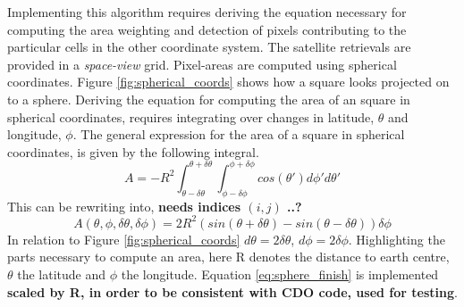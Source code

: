 
Implementing this algorithm requires deriving the equation necessary for computing the area weighting and detection of pixels contributing to the particular cells in the other coordinate system. The satellite retrievals are provided in a \textit{space-view} grid. Pixel-areas are computed using spherical coordinates. Figure \ref{fig:spherical_coords} shows how a square looks projected on to a sphere. Deriving the equation for computing the area of an square in spherical coordinates, requires integrating over changes in latitude, $\theta$ and longitude, $\phi$. The general expression for the area of a square in spherical coordinates, is given by the following integral. 
\begin{equation} \label{eq:sphere_integral}
    A = -R^2\int_{ \theta - \delta \theta }^{\theta + \delta \theta} \int_{ \phi - \delta \phi }^{\phi + \delta \phi} cos\left( \theta' \right) d\phi' d\theta'
\end{equation}
This can be rewriting into, \textbf{needs indices $(i, j)$ ..?}
\begin{equation} \label{eq:sphere_finish}
    A \left( \theta, \phi, \delta \theta, \delta \phi   \right)= 2R^2 \left( sin\left( \theta + \delta \theta  \right) - sin\left(  \theta - \delta \theta  \right) \right) \delta \phi
\end{equation}
In relation to Figure \ref{fig:spherical_coords} $d \theta = 2 \delta \theta$, $d \phi = 2 \delta \phi$. Highlighting the parts necessary to compute an area, here R denotes the distance to earth centre, $\theta$ the latitude and $\phi$ the longitude. Equation \ref{eq:sphere_finish} is implemented \textbf{scaled by R, in order to be consistent with CDO code, used for testing}. 

